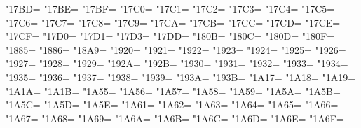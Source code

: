 \XeTeXcharclass"17BD=\KclassCM
\XeTeXcharclass"17BE=\KclassCM
\XeTeXcharclass"17BF=\KclassCM
\XeTeXcharclass"17C0=\KclassCM
\XeTeXcharclass"17C1=\KclassCM
\XeTeXcharclass"17C2=\KclassCM
\XeTeXcharclass"17C3=\KclassCM
\XeTeXcharclass"17C4=\KclassCM
\XeTeXcharclass"17C5=\KclassCM
\XeTeXcharclass"17C6=\KclassCM
\XeTeXcharclass"17C7=\KclassCM
\XeTeXcharclass"17C8=\KclassCM
\XeTeXcharclass"17C9=\KclassCM
\XeTeXcharclass"17CA=\KclassCM
\XeTeXcharclass"17CB=\KclassCM
\XeTeXcharclass"17CC=\KclassCM
\XeTeXcharclass"17CD=\KclassCM
\XeTeXcharclass"17CE=\KclassCM
\XeTeXcharclass"17CF=\KclassCM
\XeTeXcharclass"17D0=\KclassCM
\XeTeXcharclass"17D1=\KclassCM
\XeTeXcharclass"17D3=\KclassCM
\XeTeXcharclass"17DD=\KclassCM
\XeTeXcharclass"180B=\KclassCM
\XeTeXcharclass"180C=\KclassCM
\XeTeXcharclass"180D=\KclassCM
\XeTeXcharclass"180F=\KclassCM
\XeTeXcharclass"1885=\KclassCM
\XeTeXcharclass"1886=\KclassCM
\XeTeXcharclass"18A9=\KclassCM
\XeTeXcharclass"1920=\KclassCM
\XeTeXcharclass"1921=\KclassCM
\XeTeXcharclass"1922=\KclassCM
\XeTeXcharclass"1923=\KclassCM
\XeTeXcharclass"1924=\KclassCM
\XeTeXcharclass"1925=\KclassCM
\XeTeXcharclass"1926=\KclassCM
\XeTeXcharclass"1927=\KclassCM
\XeTeXcharclass"1928=\KclassCM
\XeTeXcharclass"1929=\KclassCM
\XeTeXcharclass"192A=\KclassCM
\XeTeXcharclass"192B=\KclassCM
\XeTeXcharclass"1930=\KclassCM
\XeTeXcharclass"1931=\KclassCM
\XeTeXcharclass"1932=\KclassCM
\XeTeXcharclass"1933=\KclassCM
\XeTeXcharclass"1934=\KclassCM
\XeTeXcharclass"1935=\KclassCM
\XeTeXcharclass"1936=\KclassCM
\XeTeXcharclass"1937=\KclassCM
\XeTeXcharclass"1938=\KclassCM
\XeTeXcharclass"1939=\KclassCM
\XeTeXcharclass"193A=\KclassCM
\XeTeXcharclass"193B=\KclassCM
\XeTeXcharclass"1A17=\KclassCM
\XeTeXcharclass"1A18=\KclassCM
\XeTeXcharclass"1A19=\KclassCM
\XeTeXcharclass"1A1A=\KclassCM
\XeTeXcharclass"1A1B=\KclassCM
\XeTeXcharclass"1A55=\KclassCM
\XeTeXcharclass"1A56=\KclassCM
\XeTeXcharclass"1A57=\KclassCM
\XeTeXcharclass"1A58=\KclassCM
\XeTeXcharclass"1A59=\KclassCM
\XeTeXcharclass"1A5A=\KclassCM
\XeTeXcharclass"1A5B=\KclassCM
\XeTeXcharclass"1A5C=\KclassCM
\XeTeXcharclass"1A5D=\KclassCM
\XeTeXcharclass"1A5E=\KclassCM
\XeTeXcharclass"1A61=\KclassCM
\XeTeXcharclass"1A62=\KclassCM
\XeTeXcharclass"1A63=\KclassCM
\XeTeXcharclass"1A64=\KclassCM
\XeTeXcharclass"1A65=\KclassCM
\XeTeXcharclass"1A66=\KclassCM
\XeTeXcharclass"1A67=\KclassCM
\XeTeXcharclass"1A68=\KclassCM
\XeTeXcharclass"1A69=\KclassCM
\XeTeXcharclass"1A6A=\KclassCM
\XeTeXcharclass"1A6B=\KclassCM
\XeTeXcharclass"1A6C=\KclassCM
\XeTeXcharclass"1A6D=\KclassCM
\XeTeXcharclass"1A6E=\KclassCM
\XeTeXcharclass"1A6F=\KclassCM
